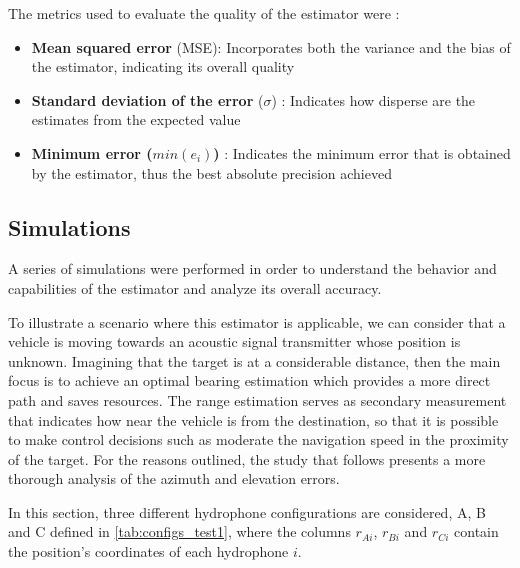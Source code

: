 The metrics used to evaluate the quality of the estimator were :

\begin{itemize}
	\item \textbf{Mean squared error} (MSE): Incorporates both the variance and the bias of the estimator, indicating its overall quality
	
	\item \textbf{Standard deviation of the error} ($\sigma$) : Indicates how disperse are the estimates from the expected value
	
	\item \textbf{Minimum error ($min(e_i)$)} : Indicates the minimum error that is obtained by the estimator, thus the best absolute precision achieved
\end{itemize} 

\subsection{Simulations}

A series of simulations were performed in order to understand the behavior and capabilities of the estimator and analyze its overall accuracy.

To illustrate a scenario where this estimator is applicable, we can consider that a vehicle is moving towards an acoustic signal transmitter whose position is unknown. Imagining that the target is at a considerable distance, then the main focus is to achieve an optimal bearing estimation which provides a more direct path and saves resources. The range estimation serves as secondary measurement that indicates how near the vehicle is from the destination, so that it is possible to make control decisions such as moderate the navigation speed in the proximity of the target. For the reasons outlined, the study that follows presents a more thorough analysis of the azimuth and elevation errors. 

In this section, three different hydrophone configurations are considered, A, B and C defined in \ref{tab:configs_test1}, where the columns $r_{Ai}$, $r_{Bi}$ and $r_{Ci}$ contain the position's coordinates of each hydrophone $i$.

